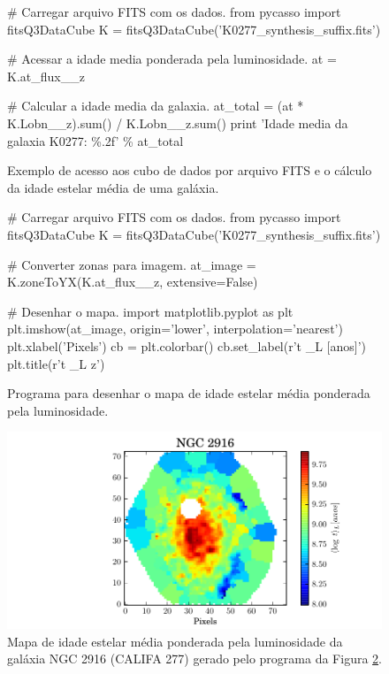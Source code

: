 \begin{figure}
\begin{python}
# Carregar arquivo FITS com os dados.
from pycasso import fitsQ3DataCube
K = fitsQ3DataCube('K0277_synthesis_suffix.fits')

# Acessar a idade media ponderada pela luminosidade.
at = K.at_flux__z

# Calcular a idade media da galaxia.
at_total = (at * K.Lobn__z).sum() / K.Lobn__z.sum()
print 'Idade media da galaxia K0277: \%.2f' \% at_total
\end{python}
	\caption[Exemplo de programa utilizando PyCASSO.]
	{Exemplo de acesso aos cubo de dados por arquivo FITS e o cálculo da idade estelar média de uma galáxia.}
	\label{fig:dataAccess}
\end{figure}

\begin{figure}
\begin{python}
# Carregar arquivo FITS com os dados.
from pycasso import fitsQ3DataCube
K = fitsQ3DataCube('K0277_synthesis_suffix.fits')

# Converter zonas para imagem.
at_image = K.zoneToYX(K.at_flux__z, extensive=False)

# Desenhar o mapa.
import matplotlib.pyplot as plt
plt.imshow(at_image, origin='lower', interpolation='nearest')
plt.xlabel('Pixels')
cb = plt.colorbar()
cb.set_label(r'\langle \log t \langle_L [anos]')
plt.title(r'\langle \log t \langle_{L z}')

\end{python}
	\caption[Programa idade estelar média.]
	{Programa para desenhar o mapa de idade	estelar média ponderada pela luminosidade.}
	\label{fig:programaMapaIdade}
\end{figure}

\begin{figure}
	\includegraphics{figuras/at_flux_zone.pdf}
	\caption[Mapa da idade estelar média da galáxia NGC 2916 (CALIFA 277).] 
	{Mapa de idade estelar média ponderada pela luminosidade da galáxia NGC 2916 (CALIFA 277) gerado pelo programa da
	Figura \ref{fig:programaMapaIdade}.}
	\label{fig:mapaIdade}
\end{figure}

